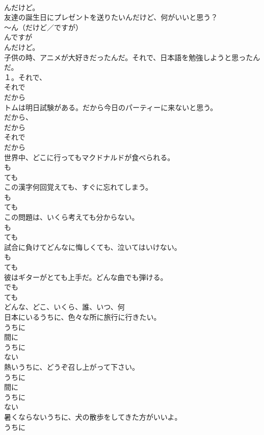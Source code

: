 \documentclass[8pt]{extreport}
\begin{document}
\begin{CJK}{UTF8}{min}
{\\	んだけど。
\\	友達の誕生日にプレゼントを送りたいんだけど、何がいいと思う？	
\\	〜ん（だけど／ですが） 
\\	んですが 
\\	んだけど。
\\	子供の時、アニメが大好きだったんだ。それで、日本語を勉強しようと思ったんだ。	
\\	１。それで、
\\	それで 
\\	だから 
\\	トムは明日試験がある。だから今日のパーティーに来ないと思う。	
\\	だから、
\\	だから 
\\	それで 
\\	だから 
\\	世界中、どこに行ってもマクドナルドが食べられる。	
\\	も 
\\	ても 
\\	この漢字何回覚えても、すぐに忘れてしまう。	
\\	も 
\\	ても 
\\	この問題は、いくら考えても分からない。	
\\	も 
\\	ても 
\\	試合に負けてどんなに悔しくても、泣いてはいけない。	
\\	も 
\\	ても 
\\	彼はギターがとても上手だ。どんな曲でも弾ける。	
\\	でも 
\\	ても 
\\	どんな、どこ、いくら、誰、いつ、何
\\	日本にいるうちに、色々な所に旅行に行きたい。	
\\	うちに 
\\	間に 
\\	うちに 
\\	ない 
\\	熱いうちに、どうぞ召し上がって下さい。	
\\	うちに 
\\	間に 
\\	うちに 
\\	ない 
\\	暑くならないうちに、犬の散歩をしてきた方がいいよ。	
\\	うちに 
}
\end{CJK}
\end{document}
